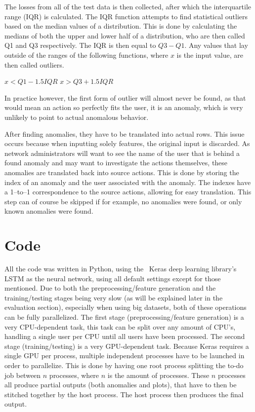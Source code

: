 The losses from all of the test data is then collected, after which the interquartile range (IQR) is calculated. The IQR function attempts to find statistical outliers based on the median values of a distribution. This is done by calculating the medians of both the upper and lower half of a distribution, who are then called Q1 and Q3 respectively. The IQR is then equal to \(Q3 - Q1\). Any values that lay outside of the ranges of the following functions, where \(x\) is the input value, are then called outliers.

\( x < Q1 - 1.5 IQR \)
\( x > Q3 + 1.5 IQR \)

In practice however, the first form of outlier will almost never be found, as that would mean an action so perfectly fits the user, it is an anomaly, which is very unlikely to point to actual anomalous behavior.

After finding anomalies, they have to be translated into actual rows. This issue occurs because when inputting solely features, the original input is discarded. As network administrators will want to see the name of the user that is behind a found anomaly and may want to investigate the actions themselves, these anomalies are translated back into source actions. This is done by storing the index of an anomaly and the user associated with the anomaly. The indexes have a 1--to--1 correspondence to the source actions, allowing for easy translation. This step can of course be skipped if for example, no anomalies were found, or only known anomalies were found.

\section{Code}
All the code was written in Python, using the~\cite{chollet2015keras} Keras deep learning library's LSTM as the neural network, using all default settings except for those mentioned. Due to both the preprocessing/feature generation and the training/testing stages being very slow (as will be explained later in the evaluation section), especially when using big datasets, both of these operations can be fully parallelized. The first stage (preprocessing/feature generation) is a very CPU-dependent task, this task can be split over any amount of CPU's, handling a single user per CPU until all users have been processed. The second stage (training/testing) is a very GPU-dependent task. Because Keras requires a single GPU per process, multiple independent processes have to be launched in order to parallelize. This is done by having one root process splitting the to-do job between \(n\) processes, where \(n\) is the amount of processes. These \(n\) processes all produce partial outputs (both anomalies and plots), that have to then be stitched together by the host process. The host process then produces the final output.